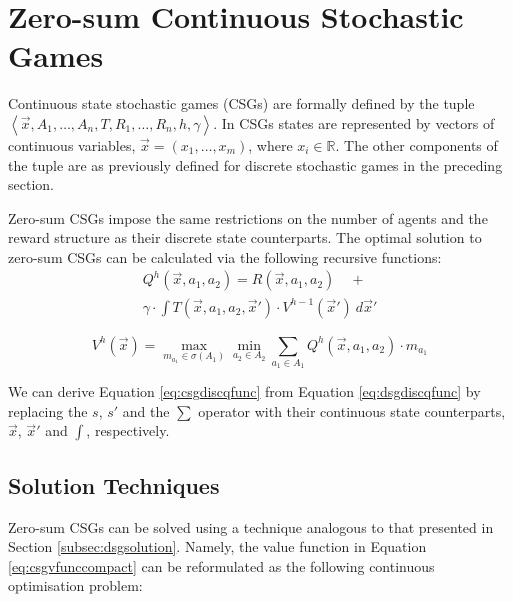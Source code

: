 \section{Zero-sum Continuous Stochastic Games}
\label{sec:csg}

Continuous state stochastic games (CSGs) are formally defined by the tuple
$ \left\langle \vec{x}, A_{1}, \ldots, A_{n}, T, R_{1}, \ldots, R_{n}, h, \gamma  \right\rangle$.
In CSGs states are represented by vectors of continuous variables, $\vec{x} = \left(x_1, \ldots, x_m \right)$, 
where $x_i \in \mathbb{R}$. The other components of the tuple are as 
previously defined for discrete stochastic games in the preceding section.

Zero-sum CSGs impose the same restrictions on the number of agents
and the reward structure as their discrete state counterparts. The 
optimal solution to zero-sum CSGs can be calculated via the 
following recursive functions:
{\footnotesize 
\abovedisplayskip=10pt
\belowdisplayskip=0pt
\begin{multline}
\label{eq:csgdiscqfunc}
  Q^{h}(\vec{x}, a_1, a_2) = R(\vec{x}, a_1, a_2) \quad + \\
   \gamma \cdot \int T(\vec{x}, a_1, a_2, \vec{x}') \cdot V^{h-1}(\vec{x}')\ d\vec{x}' 
\end{multline}
}%

{\footnotesize 
\abovedisplayskip=0pt
\belowdisplayskip=0pt
\begin{equation}
\label{eq:csgvfunccompact}
  V^{h}(\vec{x}) = \max_{m_{a_{1}} \in \sigma(A_1)} \min_{a_2 \in A_2} \sum_{a_1 \in A_1} Q^{h}(\vec{x}, a_1, a_2) \cdot m_{a_{1}}
\end{equation}
}%

We can derive Equation \eqref{eq:csgdiscqfunc} from Equation \eqref{eq:dsgdiscqfunc}
by replacing the $s$, $s'$ and the $\sum$ operator with their continuous
state counterparts, $\vec{x}$, $\vec{x}'$ and $\int$, respectively.
%

\subsection{Solution Techniques}

Zero-sum CSGs can be solved using a technique analogous to that 
presented in Section \ref{subsec:dsgsolution}. Namely, the value function in Equation
\eqref{eq:csgvfunccompact} can be reformulated as the following continuous 
optimisation problem:


